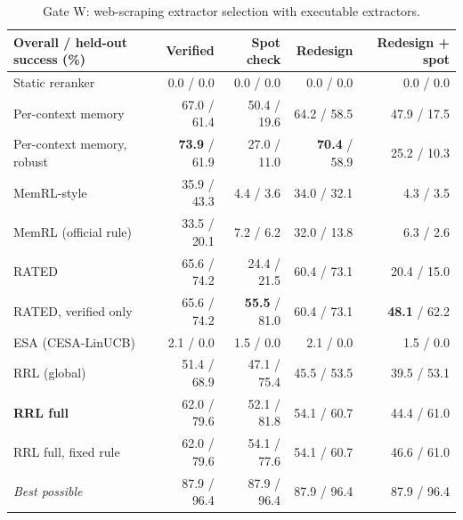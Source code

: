 \begin{table}[t]
\centering
\small
\begin{tabular}{lrrrr}
\toprule
Overall / held-out success (\%) & Verified & Spot check & Redesign & Redesign + spot \\
\midrule
Static reranker & 0.0 / 0.0 & 0.0 / 0.0 & 0.0 / 0.0 & 0.0 / 0.0 \\
Per-context memory & 67.0 / 61.4 & 50.4 / 19.6 & 64.2 / 58.5 & 47.9 / 17.5 \\
Per-context memory, robust & \textbf{73.9} / 61.9 & 27.0 / 11.0 & \textbf{70.4} / 58.9 & 25.2 / 10.3 \\
MemRL-style & 35.9 / 43.3 & 4.4 / 3.6 & 34.0 / 32.1 & 4.3 / 3.5 \\
MemRL (official rule) & 33.5 / 20.1 & 7.2 / 6.2 & 32.0 / 13.8 & 6.3 / 2.6 \\
RATED & 65.6 / 74.2 & 24.4 / 21.5 & 60.4 / 73.1 & 20.4 / 15.0 \\
RATED, verified only & 65.6 / 74.2 & \textbf{55.5} / 81.0 & 60.4 / 73.1 & \textbf{48.1} / 62.2 \\
ESA (CESA-LinUCB) & 2.1 / 0.0 & 1.5 / 0.0 & 2.1 / 0.0 & 1.5 / 0.0 \\
\midrule
RRL (global) & 51.4 / 68.9 & 47.1 / 75.4 & 45.5 / 53.5 & 39.5 / 53.1 \\
\textbf{RRL full} & 62.0 / 79.6 & 52.1 / 81.8 & 54.1 / 60.7 & 44.4 / 61.0 \\
RRL full, fixed rule & 62.0 / 79.6 & 54.1 / 77.6 & 54.1 / 60.7 & 46.6 / 61.0 \\
\textit{Best possible} & 87.9 / 96.4 & 87.9 / 96.4 & 87.9 / 96.4 & 87.9 / 96.4 \\
\bottomrule
\end{tabular}
\caption{Gate W: web-scraping extractor selection with executable extractors.}
\label{tab:gatew}
\end{table}

